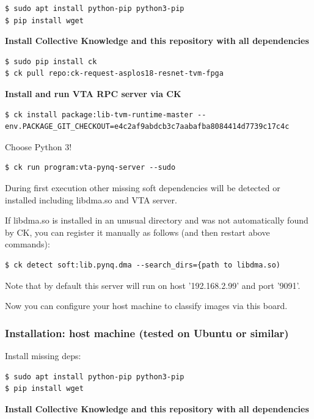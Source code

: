 \documentclass[sigconf]{acmart}
\begin{document}
\begin{verbatim}
$ sudo apt install python-pip python3-pip
$ pip install wget
\end{verbatim}

\textbf{Install Collective Knowledge and this repository with all dependencies}

\begin{verbatim}
$ sudo pip install ck
$ ck pull repo:ck-request-asplos18-resnet-tvm-fpga
\end{verbatim}

\textbf{Install and run VTA RPC server via CK}

\begin{verbatim}
$ ck install package:lib-tvm-runtime-master --env.PACKAGE_GIT_CHECKOUT=e4c2af9abdcb3c7aabafba8084414d7739c17c4c
\end{verbatim}

Choose Python 3!

\begin{verbatim}
$ ck run program:vta-pynq-server --sudo
\end{verbatim}

During first execution other missing soft dependencies 
will be detected or installed including libdma.so and VTA server.

If libdma.so is installed in an unusual directory and was not automatically found by CK, 
you can register it manually as follows (and then restart above commands):

\begin{verbatim}
$ ck detect soft:lib.pynq.dma --search_dirs={path to libdma.so)
\end{verbatim}

Note that by default this server will run on host '192.168.2.99' and port '9091'.

Now you can configure your host machine to classify images via this board.

\subsubsection{Installation: host machine (tested on Ubuntu or similar)}

Install missing deps:

\begin{verbatim}
$ sudo apt install python-pip python3-pip
$ pip install wget
\end{verbatim}

\textbf{Install Collective Knowledge and this repository with all dependencies}
\end{document}

